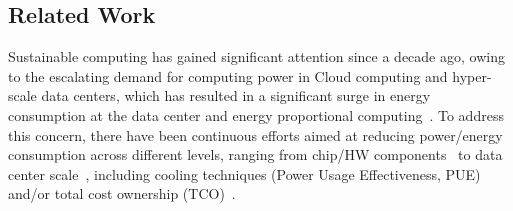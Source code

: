 \subsection{Related Work}
Sustainable computing has gained significant attention since a decade ago, owing to the escalating demand for computing power in Cloud computing and hyper-scale data centers, which has resulted in a significant surge in energy consumption at the data center and energy proportional computing~\cite{dc_computer}. To address this concern, there have been continuous efforts aimed at reducing power/energy consumption across different levels, ranging from chip/HW components~\cite{jouppi2023tpu,jiang2020power,capra2020updated} to data center scale~\cite{7229319,7738551,7279063,9752582}, including cooling techniques (Power Usage Effectiveness, PUE) and/or total cost ownership (TCO)~\cite{ZHANG2021102253,mukherjee2020detailed,CHAUHAN2019450,ROSTIROLLA2022111787}. %

